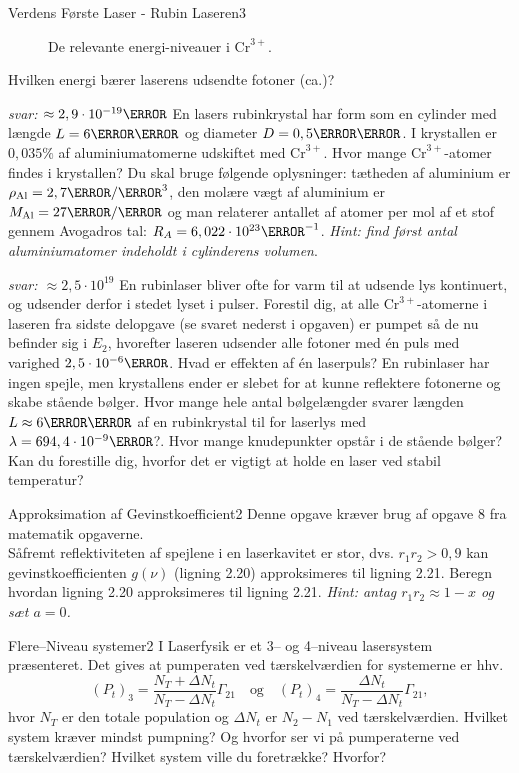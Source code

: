 \begin{opgave}{Verdens Første Laser - Rubin Laseren}{3}
\begin{figure}[h!]
  \caption{De relevante energi-niveauer i $\text{Cr}^{3+}$.}
  \label{fig:rubin_energi_diagram}
\end{figure}
Hvilken energi bærer laserens udsendte fotoner (ca.)?

\emph{svar: $\approx 2,9\cdot 10^{-19} \joule$}
\opg En lasers rubinkrystal har form som en cylinder med længde $L=6\centi\meter$ og diameter $D=0,5\centi\meter$. I krystallen er $0,035\%$ af aluminiumatomerne udskiftet med $\text{Cr}^{3+}$. Hvor mange $\text{Cr}^{3+}$-atomer findes i krystallen? Du skal bruge følgende oplysninger: tætheden af aluminium er $\rho_\text{Al}=2,7\g/\cm^3$, den molære vægt af aluminium er $M_\text{Al}=27\g/\mol$ og man relaterer antallet af atomer per mol af et stof gennem Avogadros tal: $R_A = 6,022 \cdot 10^{23} \mol^{-1}$. \emph{Hint: find først antal aluminiumatomer indeholdt i cylinderens volumen}.

\emph{svar: $\approx 2,5 \cdot 10^{19}$} 
\opg En rubinlaser bliver ofte for varm til at udsende lys kontinuert, og udsender derfor i stedet lyset i pulser. Forestil dig, at alle $\text{Cr}^{3+}$-atomerne i laseren fra sidste delopgave (se svaret nederst i opgaven) er pumpet så de nu befinder sig i $E_2$, hvorefter laseren udsender alle fotoner med én puls med varighed $2,5 \cdot 10^{-6}\s$. Hvad er effekten af én laserpuls?
\opg En rubinlaser har ingen spejle, men krystallens ender er slebet for at kunne reflektere fotonerne og skabe stående bølger. Hvor mange hele antal bølgelængder svarer længden $L \approx 6\centi\meter$ af en rubinkrystal til for laserlys med $\lambda = 694,4 \cdot 10^{-9} \m$?. Hvor mange knudepunkter opstår i de stående bølger?
\opg Kan du forestille dig, hvorfor det er vigtigt at holde en laser ved stabil temperatur?
\end{opgave}

\begin{opgave}{Approksimation af Gevinstkoefficient}{2}
Denne opgave kræver brug af opgave 8 fra matematik opgaverne. \\
Såfremt reflektiviteten af spejlene i en laserkavitet er stor, dvs. $r_1r_2>0,9$ kan gevinstkoefficienten $g(\nu)$ (ligning 2.20) approksimeres til ligning 2.21. 
\opg Beregn hvordan ligning 2.20 approksimeres til ligning 2.21. \emph{Hint: antag $r_1r_2\approx 1-x$ og sæt $a=0$.}
\end{opgave}

\begin{opgave}{Flere--Niveau systemer}{2}
I Laserfysik er et 3-- og 4--niveau lasersystem præsenteret. Det gives at pumperaten ved tærskelværdien for systemerne er hhv. 
\begin{equation}
(P_t)_3 = \frac{N_T+\Delta N_t}{N_T - \Delta N_t}\Gamma_{21} \,\,\,\,\,\, \text{og} \,\,\,\,\,\, (P_t)_4 = \frac{\Delta N_t}{N_T - \Delta N_t}\Gamma_{21},
\end{equation}
hvor $N_T$ er den totale population og $\Delta N_t$ er $N_2-N_1$ ved tærskelværdien. 
\opg Hvilket system kræver mindst pumpning? Og hvorfor ser vi på pumperaterne ved tærskelværdien? 
\opg Hvilket system ville du foretrække? Hvorfor? 
\end{opgave}

